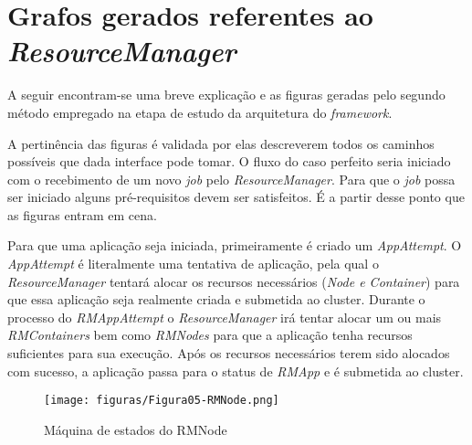 
\chapter{Grafos gerados referentes ao \emph{ResourceManager}}
\label{chap:ApendA}

A seguir encontram-se uma breve explicação e as figuras geradas pelo segundo método empregado na etapa de estudo da arquitetura do \emph{framework}.

A pertinência das figuras é validada por elas descreverem todos os caminhos possíveis que dada interface pode tomar. O fluxo do caso perfeito seria iniciado com o recebimento de um novo \emph{job} pelo \emph{ResourceManager}. Para que o \emph{job} possa ser iniciado alguns pré-requisitos devem ser satisfeitos. É a partir desse ponto que as figuras entram em cena.

Para que uma aplicação seja iniciada, primeiramente é criado um \emph{AppAttempt}. O \emph{AppAttempt} é literalmente uma tentativa de aplicação, pela qual o \emph{ResourceManager} tentará alocar os recursos necessários (\emph{Node e Container}) para que essa aplicação seja realmente criada e submetida ao cluster. Durante o processo do \emph{RMAppAttempt} o \emph{ResourceManager} irá tentar alocar um ou mais \emph{RMContainers} bem como \emph{RMNodes} para que a aplicação tenha recursos suficientes para sua execução. Após os recursos necessários terem sido alocados com sucesso, a aplicação passa para o status de \emph{RMApp} e é submetida ao cluster.


\begin{figure}[hbtn]
   \centering
   \texttt{[image: figuras/Figura05-RMNode.png]}
   \caption{Máquina de estados do RMNode}
   \label{fig:RMNode}
\end{figure}

